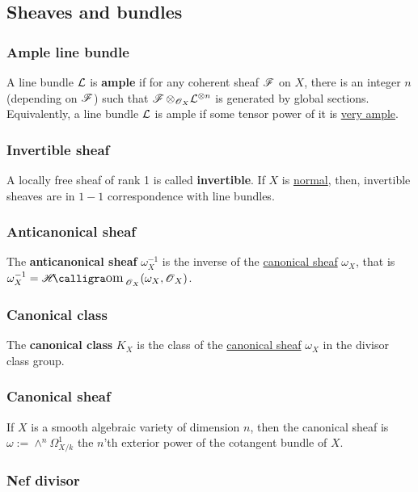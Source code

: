 \documentclass[11pt, english]{article}
\begin{document}
\subsection{Sheaves and bundles}
\subsubsection{Ample line bundle}
\label{amplelinebundle}
A line bundle $\mathcal{L}$ is \textbf{ample} if for any coherent sheaf $\operatorname{\mathscr{F}}$ on $X$, there is an integer $n$ (depending on $\operatorname{\mathscr{F}}$) such that $\operatorname{\mathscr{F}} \otimes_{\operatorname{\mathscr{O}}_X} \mathcal{L}^{\otimes n}$ is generated by global sections. Equivalently, a line bundle $\mathcal{L}$ is ample if some tensor power of it is \hyperref[veryample]{very ample}.

\subsubsection{Invertible sheaf}
\label{invertiblesheaf}
A locally free sheaf of rank 1 is called \textbf{invertible}. If $X$ is \hyperref[normalvariety]{normal}, then, invertible sheaves are in $1-1$ correspondence with line bundles.  

\subsubsection{Anticanonical sheaf}
\label{anticanonical}

The \textbf{anticanonical sheaf} $\omega_X^{-1}$ is the inverse of the \hyperref[canonicalsheaf]{canonical sheaf} $\omega_X$, that is $\omega_X^{-1} = \Shom_{\OO_X}(\omega_X,\OO_X)$.

\subsubsection{Canonical class}
\label{canonicaldivisor}

The \textbf{canonical class} $K_X$ is the class of the \hyperref[canonicalsheaf]{canonical sheaf} $\omega_X$ in the divisor class group.

\subsubsection{Canonical sheaf}
\label{canonicalsheaf} 

If $X$ is a smooth algebraic variety of dimension $n$, then the canonical sheaf is $\omega := \wedge^n \Omega^1_{X/k}$ the $n$'th exterior power of the cotangent bundle of $X$.

\subsubsection{Nef divisor}
\label{nef}
\end{document}

